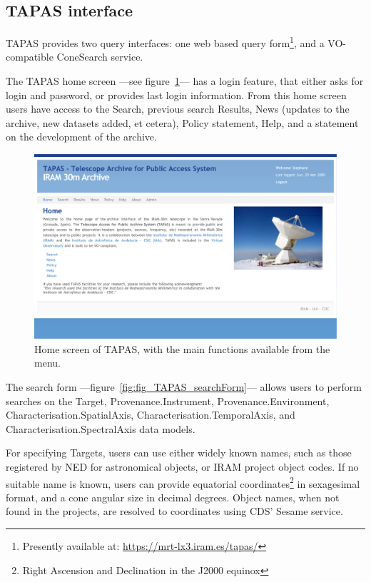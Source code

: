 		
		\subsection{TAPAS interface} %
		\label{sub:tapas_interface}
		
			TAPAS provides two query interfaces: one web based
			query form\footnote{Presently available
			at: \url{https://mrt-lx3.iram.es/tapas/}}, and a
			VO-compatible ConeSearch service.
			
			The TAPAS home screen ---see
			figure~\ref{fig:fig_TAPAS_home}--- has a login feature,
			that either asks for login and password, or provides
			last login information. From this home screen users
			have access to the Search, previous search Results,
			News (updates to the archive, new datasets added, et
			cetera), Policy statement, Help, and a statement on the
			development of the archive.
			
			\begin{figure}[tbp]
				\centering
					\includegraphics[width=\textwidth]
					{fig/TAPAS_home.pdf}
				\caption[TAPAS home screen]{Home screen of TAPAS,
				with the main functions available from the menu.}
				\label{fig:fig_TAPAS_home}
			\end{figure}
			
			The search form
			---figure~\ref{fig:fig_TAPAS_searchForm}--- allows
			users to perform searches on the Target,
			Provenance.Instrument,
			Provenance.Environment,
			Cha\-rac\-teri\-sa\-tion.Spa\-tial\-Axis,
			Cha\-rac\-teri\-sa\-tion.Tem\-po\-ral\-Axis, and
			Cha\-rac\-teri\-sa\-tion.Spec\-tral\-Axis data models.
			
			For specifying Targets, users can use either widely
			known names, such as those registered by NED for
			astronomical objects, or IRAM project object codes. If
			no suitable name is known, users can provide equatorial
			coordinates\footnote{Right Ascension and Declination
			in the J2000 equinox} in sexagesimal format, and a cone
			angular size in decimal degrees. Object names, when not
			found in the projects, are resolved to coordinates
			using CDS' Sesame service.
			
